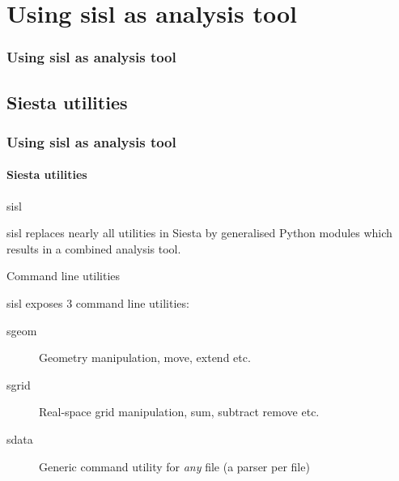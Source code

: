 
\section{Using sisl as analysis tool}

\begin{frame}
  \frametitle{Using sisl as analysis tool}
  \tableofcontents[currentsection]
\end{frame}

\subsection{Siesta utilities}

\begin{frame}
  \frametitle{Using sisl as analysis tool}
  \framesubtitle{Siesta utilities}

  \begin{block}{sisl}

    sisl replaces nearly all utilities in Siesta by generalised Python
    modules which results in a combined analysis tool.

  \end{block}

  \begin{block}{Command line utilities}

    sisl exposes 3 command line utilities:

    \begin{description}
      \item[sgeom] Geometry manipulation, move, extend etc.

      \item[sgrid] Real-space grid manipulation, sum, subtract remove etc.

      \item[sdata] Generic command utility for \emph{any} file (a parser per file)

    \end{description}

  \end{block}


\end{frame}
